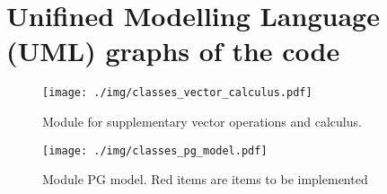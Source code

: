 \section{Unifined Modelling Language (UML) graphs of the code}

\begin{figure}[ht]
    \centering
    \texttt{[image: ./img/classes\_vector\_calculus.pdf]}
    \caption{Module for supplementary vector operations and calculus.}
\end{figure}


\begin{figure}[ht]
    \centering
    \texttt{[image: ./img/classes\_pg\_model.pdf]}
    \caption{Module PG model. Red items are items to be implemented}
\end{figure}
